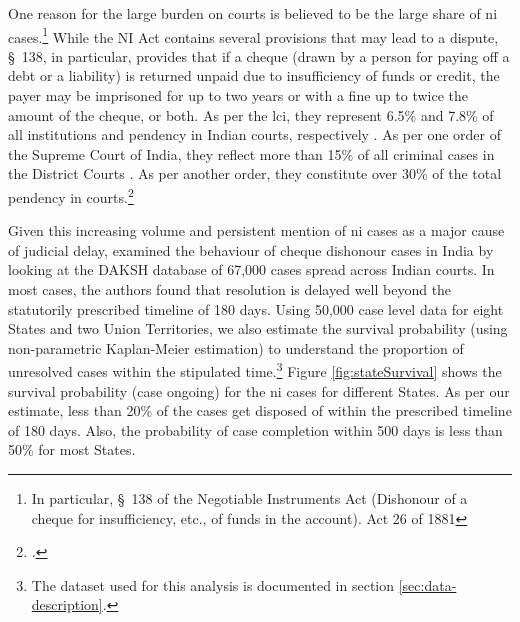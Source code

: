 \documentclass[12pt,a4paper]{article}
\begin{document}
One reason for the large burden on courts is believed to be the large share of \gls{ni} cases.\footnote{In particular, \S~138 of the Negotiable Instruments Act (Dishonour of a cheque for insufficiency, etc., of funds in the account). Act 26 of 1881} While the NI Act contains several provisions that may lead to a dispute, \S~138, in particular, provides that if a cheque (drawn by a person for paying off a debt or a liability) is returned unpaid due to insufficiency of funds or credit, the payer may be imprisoned for up to two years or with a fine up to twice the amount of the cheque, or both. As per the \gls{lci}, they represent 6.5\% and 7.8\% of all institutions and pendency in Indian courts, respectively \autocite{lci2014_arrears}. As per one order of the Supreme Court of India, they reflect more than 15\% of all criminal cases in the District Courts \autocite{sc2020_makwanavstate}. As per another order, they constitute over 30\% of the total pendency in courts.\footcite[Similarly, a study published by the Department of Justice briefly touches on the burden of such cases on the judiciary and posits that they constitute 34\% of pending criminal cases in Maharashtra.][]{sc2020_138, mahadik2018_maharashtra}

Given this increasing volume and persistent mention of \gls{ni} cases as a major cause of judicial delay, \textcite{sridhar2017_cheque} examined the behaviour of cheque dishonour cases in India by looking at the DAKSH database of 67,000 cases spread across Indian courts. In most cases, the authors found that resolution is delayed well beyond the statutorily prescribed timeline of 180 days. Using 50,000 case level data for eight States and two Union Territories, we also estimate the survival probability (using non-parametric Kaplan-Meier estimation) to understand the proportion of unresolved cases within the stipulated time.\footnote{The dataset used for this analysis is documented in section \ref{sec:data-description}.} Figure \ref{fig:stateSurvival} shows the survival probability (case ongoing) for the \gls{ni} cases for different States. As per our estimate, less than 20\% of the cases get disposed of within the prescribed timeline of 180 days. Also, the probability of case completion within 500 days is less than 50\% for most States.
\end{document}
